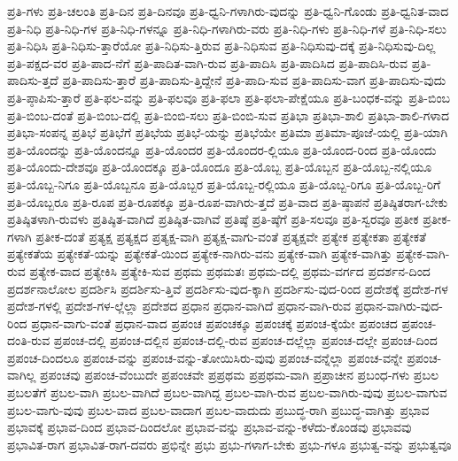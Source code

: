 {ಪ್ರತಿ-ಗಳು
ಪ್ರತಿ-ಚಲಂತಿ
ಪ್ರತಿ-ದಿನ
ಪ್ರತಿ-ದಿನವೂ
ಪ್ರತಿ-ಧ್ವನಿ-ಗಳಾಗಿರು-ವುದನ್ನು
ಪ್ರತಿ-ಧ್ವನಿ-ಗೊಂಡು
ಪ್ರತಿ-ಧ್ವನಿತ-ವಾದ
ಪ್ರತಿ-ನಿಧಿ
ಪ್ರತಿ-ನಿಧಿ-ಗಳ
ಪ್ರತಿ-ನಿಧಿ-ಗಳನ್ನೂ
ಪ್ರತಿ-ನಿಧಿ-ಗಳಾಗಿರು-ವರು
ಪ್ರತಿ-ನಿಧಿ-ಗಳು
ಪ್ರತಿ-ನಿಧಿ-ಗಳೆ
ಪ್ರತಿ-ನಿಧಿ-ಸಲು
ಪ್ರತಿ-ನಿಧಿಸಿ
ಪ್ರತಿ-ನಿಧಿಸು-ತ್ತಾರೆಯೋ
ಪ್ರತಿ-ನಿಧಿಸು-ತ್ತಿರುವ
ಪ್ರತಿ-ನಿಧಿಸುವ
ಪ್ರತಿ-ನಿಧಿಸುವು-ದಕ್ಕೆ
ಪ್ರತಿ-ನಿಧಿಸುವು-ದಿಲ್ಲ
ಪ್ರತಿ-ಪಕ್ಷದ-ವರ
ಪ್ರತಿ-ಪಾದ-ನೆಗೆ
ಪ್ರತಿ-ಪಾದಿತ-ವಾಗಿ-ರುವ
ಪ್ರತಿ-ಪಾದಿಸಿ
ಪ್ರತಿ-ಪಾದಿಸಿದ
ಪ್ರತಿ-ಪಾದಿಸಿ-ರುವ
ಪ್ರತಿ-ಪಾದಿಸು-ತ್ತದೆ
ಪ್ರತಿ-ಪಾದಿಸು-ತ್ತಾರೆ
ಪ್ರತಿ-ಪಾದಿಸು-ತ್ತಿದ್ದೇನೆ
ಪ್ರತಿ-ಪಾದಿ-ಸುವ
ಪ್ರತಿ-ಪಾದಿಸು-ವಾಗ
ಪ್ರತಿ-ಪಾದಿಸು-ವುದು
ಪ್ರತಿ-ಪ್ಠಾಪಿಸು-ತ್ತಾರೆ
ಪ್ರತಿ-ಫಲ-ವನ್ನು
ಪ್ರತಿ-ಫಲವೂ
ಪ್ರತಿ-ಫಲಾ
ಪ್ರತಿ-ಫಲಾ-ಪೇಕ್ಷೆಯೂ
ಪ್ರತಿ-ಬಂಧಕ-ವನ್ನು
ಪ್ರತಿ-ಬಿಂಬ
ಪ್ರತಿ-ಬಿಂಬ-ದಂತೆ
ಪ್ರತಿ-ಬಿಂಬ-ದಲ್ಲಿ
ಪ್ರತಿ-ಬಿಂಬಿ-ಸಲು
ಪ್ರತಿ-ಬಿಂಬಿ-ಸುವ
ಪ್ರತಿಭಾ
ಪ್ರತಿಭಾ-ಶಾಲಿ
ಪ್ರತಿಭಾ-ಶಾಲಿ-ಗಳಾದ
ಪ್ರತಿಭಾ-ಸಂಪನ್ನ
ಪ್ರತಿಭೆ
ಪ್ರತಿಭೆಗೆ
ಪ್ರತಿಭೆಯ
ಪ್ರತಿಭೆ-ಯನ್ನು
ಪ್ರತಿಭೆಯೇ
ಪ್ರತಿಮಾ
ಪ್ರತಿಮಾ-ಪೂಜೆ-ಯಲ್ಲಿ
ಪ್ರತಿ-ಯಾಗಿ
ಪ್ರತಿ-ಯೊಂದನ್ನು
ಪ್ರತಿ-ಯೊಂದನ್ನೂ
ಪ್ರತಿ-ಯೊಂದರ
ಪ್ರತಿ-ಯೊಂದರ-ಲ್ಲಿಯೂ
ಪ್ರತಿ-ಯೊಂದ-ರಿಂದ
ಪ್ರತಿ-ಯೊಂದು
ಪ್ರತಿ-ಯೊಂದು-ದೇಶವೂ
ಪ್ರತಿ-ಯೊಂದಕ್ಕೂ
ಪ್ರತಿ-ಯೊಂದೂ
ಪ್ರತಿ-ಯೊಬ್ಬ
ಪ್ರತಿ-ಯೊಬ್ಬನ
ಪ್ರತಿ-ಯೊಬ್ಬ-ನಲ್ಲಿಯೂ
ಪ್ರತಿ-ಯೊಬ್ಬ-ನಿಗೂ
ಪ್ರತಿ-ಯೊಬ್ಬನೂ
ಪ್ರತಿ-ಯೊಬ್ಬರ
ಪ್ರತಿ-ಯೊಬ್ಬ-ರಲ್ಲಿಯೂ
ಪ್ರತಿ-ಯೊಬ್ಬ-ರಿಗೂ
ಪ್ರತಿ-ಯೊಬ್ಬ-ರಿಗೆ
ಪ್ರತಿ-ಯೊಬ್ಬರೂ
ಪ್ರತಿ-ರೂಪ
ಪ್ರತಿ-ರೂಪಕ್ಕೂ
ಪ್ರತಿ-ರೂಪ-ವಾಗಿರು-ತ್ತದೆ
ಪ್ರತಿ-ವಾದ
ಪ್ರತಿ-ಷ್ಠಾಪನೆ
ಪ್ರತಿಷ್ಠಿತರಾಗ-ಬೇಕು
ಪ್ರತಿಷ್ಠಿತಳಾಗಿ-ರುವಳು
ಪ್ರತಿಷ್ಠಿತ-ವಾಗಿದೆ
ಪ್ರತಿಷ್ಠಿತ-ವಾಗಿವೆ
ಪ್ರತಿಷ್ಠೆ
ಪ್ರತಿ-ಷ್ಠೆಗೆ
ಪ್ರತಿ-ಸಲವೂ
ಪ್ರತಿ-ಸ್ವರವೂ
ಪ್ರತೀಕ
ಪ್ರತೀಕ-ಗಳಾಗಿ
ಪ್ರತೀಕ-ದಂತೆ
ಪ್ರತ್ಯಕ್ಷ
ಪ್ರತ್ಯಕ್ಷದ
ಪ್ರತ್ಯಕ್ಷ-ವಾಗಿ
ಪ್ರತ್ಯಕ್ಷ-ವಾಗು-ವಂತೆ
ಪ್ರತ್ಯಕ್ಷವೇ
ಪ್ರತ್ಯೇಕ
ಪ್ರತ್ಯೇಕತಾ
ಪ್ರತ್ಯೇಕತೆ
ಪ್ರತ್ಯೇಕತೆಯ
ಪ್ರತ್ಯೇಕತೆ-ಯನ್ನು
ಪ್ರತ್ಯೇಕತೆ-ಯಿಂದ
ಪ್ರತ್ಯೇಕ-ನಾಗಿರು-ವನು
ಪ್ರತ್ಯೇಕ-ವಾಗಿ
ಪ್ರತ್ಯೇಕ-ವಾಗಿತ್ತು
ಪ್ರತ್ಯೇಕ-ವಾಗಿ-ರುವ
ಪ್ರತ್ಯೇಕ-ವಾದ
ಪ್ರತ್ಯೇಕಿಸಿ
ಪ್ರತ್ಯೇಕಿ-ಸುವ
ಪ್ರಥಮ
ಪ್ರಥಮತಃ
ಪ್ರಥಮ-ದಲ್ಲಿ
ಪ್ರಥಮ-ವರ್ಗದ
ಪ್ರದರ್ಶನ-ದಿಂದ
ಪ್ರದರ್ಶನಾಲೋಲ
ಪ್ರದರ್ಶಿಸಿ
ಪ್ರದರ್ಶಿಸು-ತ್ತಿವೆ
ಪ್ರದರ್ಶಿಸು-ವುದ-ಕ್ಕಾಗಿ
ಪ್ರದರ್ಶಿಸು-ವುದ-ರಿಂದ
ಪ್ರದೇಶಕ್ಕೆ
ಪ್ರದೇಶ-ಗಳ
ಪ್ರದೇಶ-ಗಳಲ್ಲಿ
ಪ್ರದೇಶ-ಗಳ-ಲ್ಲೆಲ್ಲಾ
ಪ್ರದೇಶದ
ಪ್ರಧಾನ
ಪ್ರಧಾನ-ವಾಗಿದೆ
ಪ್ರಧಾನ-ವಾಗಿ-ರುವ
ಪ್ರಧಾನ-ವಾಗಿರು-ವುದ-ರಿಂದ
ಪ್ರಧಾನ-ವಾಗು-ವಂತೆ
ಪ್ರಧಾನ-ವಾದ
ಪ್ರಪಂಚ
ಪ್ರಪಂಚಕ್ಕೂ
ಪ್ರಪಂಚಕ್ಕೆ
ಪ್ರಪಂಚ-ಕ್ಕೆಯೇ
ಪ್ರಪಂಚದ
ಪ್ರಪಂಚ-ದಂತಿ-ರುವ
ಪ್ರಪಂಚ-ದಲ್ಲಿ
ಪ್ರಪಂಚ-ದಲ್ಲಿನ
ಪ್ರಪಂಚ-ದಲ್ಲಿ-ರುವ
ಪ್ರಪಂಚ-ದಲ್ಲೆಲ್ಲಾ
ಪ್ರಪಂಚ-ದಲ್ಲೇ
ಪ್ರಪಂಚ-ದಿಂದ
ಪ್ರಪಂಚ-ದಿಂದಲೂ
ಪ್ರಪಂಚ-ವನ್ನು
ಪ್ರಪಂಚ-ವನ್ನು-ತೋಯಿಸಿರು-ವುವು
ಪ್ರಪಂಚ-ವನ್ನೆಲ್ಲಾ
ಪ್ರಪಂಚ-ವನ್ನೇ
ಪ್ರಪಂಚ-ವಾಗಿಲ್ಲ
ಪ್ರಪಂಚವು
ಪ್ರಪಂಚ-ವೆಂಬುದೇ
ಪ್ರಪಂಚವೇ
ಪ್ರಪ್ರಥಮ
ಪ್ರಪ್ರಥಮ-ವಾಗಿ
ಪ್ರಪ್ರಾಚೀನ
ಪ್ರಬಂಧ-ಗಳು
ಪ್ರಬಲ
ಪ್ರಬಲತೆಗೆ
ಪ್ರಬಲ-ವಾಗಿ
ಪ್ರಬಲ-ವಾಗಿದೆ
ಪ್ರಬಲ-ವಾಗಿದ್ದ
ಪ್ರಬಲ-ವಾಗಿ-ರುವ
ಪ್ರಬಲ-ವಾಗಿರು-ವುವು
ಪ್ರಬಲ-ವಾಗುವ
ಪ್ರಬಲ-ವಾಗು-ವುವು
ಪ್ರಬಲ-ವಾದ
ಪ್ರಬಲ-ವಾದಾಗ
ಪ್ರಬಲ-ವಾದುದು
ಪ್ರಬುದ್ಧ-ರಾಗಿ
ಪ್ರಬುದ್ಧ-ವಾಗಿತ್ತು
ಪ್ರಭಾವ
ಪ್ರಭಾವಕ್ಕೆ
ಪ್ರಭಾವ-ದಿಂದ
ಪ್ರಭಾವ-ದಿಂದಲೋ
ಪ್ರಭಾವ-ವನ್ನು
ಪ್ರಭಾವ-ವನ್ನು-ಕಳೆದು-ಕೊಂಡವು
ಪ್ರಭಾವವು
ಪ್ರಭಾವಿತ-ರಾಗ
ಪ್ರಭಾವಿತ-ರಾಗ-ದವರು
ಪ್ರಭಿನ್ನೇ
ಪ್ರಭು
ಪ್ರಭು-ಗಳಾಗ-ಬೇಕು
ಪ್ರಭು-ಗಳೂ
ಪ್ರಭುತ್ವ-ವನ್ನು
ಪ್ರಭುತ್ವವೂ
}
